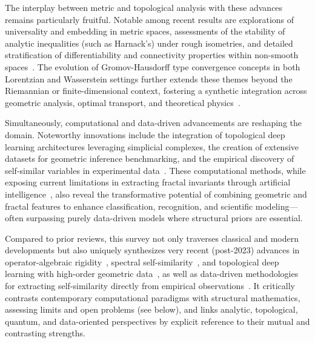 \documentclass[sigconf]{acmart}
\begin{document}
The interplay between metric and topological analysis with these advances remains particularly fruitful. Notable among recent results are explorations of universality and embedding in metric spaces, assessments of the stability of analytic inequalities (such as Harnack's) under rough isometries, and detailed stratification of differentiability and connectivity properties within non-smooth spaces~\cite{ref50,ref53,ref54,ref81}. The evolution of Gromov-Hausdorff type convergence concepts in both Lorentzian and Wasserstein settings further extends these themes beyond the Riemannian or finite-dimensional context, fostering a synthetic integration across geometric analysis, optimal transport, and theoretical physics~\cite{ref78,ref107,ref108}.

Simultaneously, computational and data-driven advancements are reshaping the domain. Noteworthy innovations include the integration of topological deep learning architectures leveraging simplicial complexes, the creation of extensive datasets for geometric inference benchmarking, and the empirical discovery of self-similar variables in experimental data~\cite{ref60,ref101}. These computational methods, while exposing current limitations in extracting fractal invariants through artificial intelligence~\cite{ref44}, also reveal the transformative potential of combining geometric and fractal features to enhance classification, recognition, and scientific modeling---often surpassing purely data-driven models where structural priors are essential.

Compared to prior reviews, this survey not only traverses classical and modern developments but also uniquely synthesizes very recent (post-2023) advances in operator-algebraic rigidity~\cite{ref52}, spectral self-similarity~\cite{ref54}, and topological deep learning with high-order geometric data~\cite{ref26}, as well as data-driven methodologies for extracting self-similarity directly from empirical observations~\cite{ref65}. It critically contrasts contemporary computational paradigms with structural mathematics, assessing limits and open problems (see below), and links analytic, topological, quantum, and data-oriented perspectives by explicit reference to their mutual and contrasting strengths.
\end{document}
